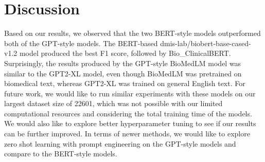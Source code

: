 \documentclass[manuscript,screen,review,nonacm]{acmart}
\begin{document}
\section{Discussion}

Based on our results, we observed that the two BERT-style models outperformed both of the GPT-style models. The BERT-based dmis-lab/biobert-base-cased-v1.2 model produced the best F1 score, followed by Bio\_ClinicalBERT. Surprisingly, the results produced by the GPT-style BioMedLM model was similar to the GPT2-XL model, even though BioMedLM was pretrained on biomedical text, whereas GPT2-XL was trained on general English text. For future work, we would like to run similar experiments with these models on our largest dataset size of 22601, which was not possible with our limited computational resources and considering the total training time of the models. We would also like to explore better hyperparameter tuning to see if our results can be further improved. In terms of newer methods, we would like to explore zero shot learning with prompt engineering on the GPT-style models and compare to the BERT-style models. 




\end{document}

